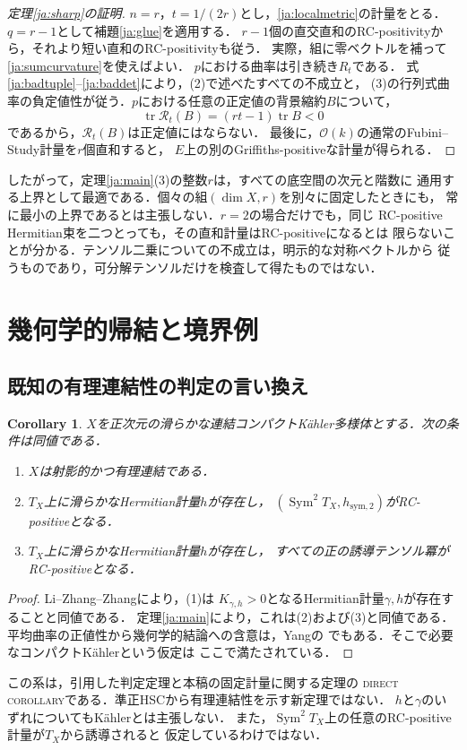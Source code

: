\documentclass[12pt]{amsart}
\newtheorem{cor}[thm]{Corollary}
\theoremstyle{definition}
\theoremstyle{remark}
\numberwithin{equation}{section}
\DeclareMathOperator{\tr}{tr}
\DeclareMathOperator{\Sym}{Sym}
\theoremstyle{definition}
\begin{document}
\begin{proof}[定理\ref{ja:sharp}の証明]
$n=r$，$t=1/(2r)$とし，\eqref{ja:localmetric}の計量をとる．
$q=r-1$として補題\ref{ja:glue}を適用する．
$r-1$個の直交直和のRC-positivityから，それより短い直和のRC-positivityも従う．
実際，組に零ベクトルを補って\eqref{ja:sumcurvature}を使えばよい．
$p$における曲率は引き続き$R_t$である．
式\eqref{ja:badtuple}--\eqref{ja:baddet}により，(2)で述べたすべての不成立と，
(3)の行列式曲率の負定値性が従う．$p$における任意の正定値の背景縮約$B$について，
\[
 \tr\mathcal R_t(B)=(rt-1)\tr B<0
\]
であるから，$\mathcal R_t(B)$は正定値にはならない．
最後に，$\mathcal O(k)$の通常のFubini--Study計量を$r$個直和すると，
$E$上の別のGriffiths-positiveな計量が得られる．
\end{proof}

したがって，定理\ref{ja:main}(3)の整数$r$は，すべての底空間の次元と階数に
通用する上界として最適である．個々の組$(\dim X,r)$を別々に固定したときにも，
常に最小の上界であるとは主張しない．$r=2$の場合だけでも，同じ
RC-positive Hermitian束を二つとっても，その直和計量はRC-positiveになるとは
限らないことが分かる．テンソル二乗についての不成立は，明示的な対称ベクトルから
従うものであり，可分解テンソルだけを検査して得たものではない．

\section{幾何学的帰結と境界例}
\label{ja:applications}

\subsection{既知の有理連結性の判定の言い換え}
\begin{cor}\label{ja:rcgeometry}
$X$を正次元の滑らかな連結コンパクトK\"ahler多様体とする．次の条件は同値である．
\begin{enumerate}
\item $X$は射影的かつ有理連結である．
\item $T_X$上に滑らかなHermitian計量$h$が存在し，
$(\Sym^2T_X,h_{\mathrm{sym},2})$がRC-positiveとなる．
\item $T_X$上に滑らかなHermitian計量$h$が存在し，
すべての正の誘導テンソル冪がRC-positiveとなる．
\end{enumerate}
\end{cor}
\begin{proof}
Li--Zhang--Zhang\cite[Theorem 1.7]{ja:LZZ}により，(1)は
$K_{\gamma,h}>0$となるHermitian計量$\gamma,h$が存在することと同値である．
定理\ref{ja:main}により，これは(2)および(3)と同値である．
平均曲率の正値性から幾何学的結論への含意は，Yangの
\cite[Corollary 1.5]{ja:Yan18}でもある．そこで必要なコンパクトK\"ahlerという仮定は
ここで満たされている．
\end{proof}
この系は，引用した判定定理と本稿の固定計量に関する定理の
\textsc{direct corollary}である．準正HSCから有理連結性を示す新定理ではない．
$h$と$\gamma$のいずれについてもK\"ahlerとは主張しない．
また，$\Sym^2T_X$上の任意のRC-positive計量が$T_X$から誘導されると
仮定しているわけではない．
\end{document}
